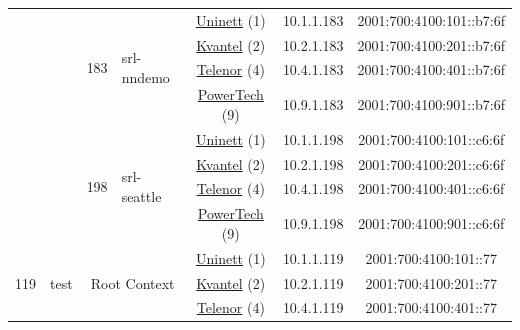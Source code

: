 \begin{small}
\begin{center}
\begin{longtable}{|c|c|c|c|c|c|c|c|}
  &  & \multirow{4}{*}{\tiny{183}} & \multicolumn{1}{|l|}{\multirow{4}{*}{\tiny{srl-nndemo}}} & \multicolumn{2}{|c|}{\tiny{\href{https://www.uninett.no}{Uninett} (1)}} & \tiny{10.1.1.183} & \tiny{2001:700:4100:101::b7:6f} \\* \cline{5-5}\cline{6-6}\cline{7-7}\cline{8-8}
  &  &  &  & \multicolumn{2}{|c|}{\tiny{\href{http://kvantel.no}{Kvantel} (2)}} & \tiny{10.2.1.183} & \tiny{2001:700:4100:201::b7:6f} \\* \cline{5-5}\cline{6-6}\cline{7-7}\cline{8-8}
  &  &  &  & \multicolumn{2}{|c|}{\tiny{\href{https://www.telenor.no}{Telenor} (4)}} & \tiny{10.4.1.183} & \tiny{2001:700:4100:401::b7:6f} \\* \cline{5-5}\cline{6-6}\cline{7-7}\cline{8-8}
  &  &  &  & \multicolumn{2}{|c|}{\tiny{\href{http://www.powertech.no}{PowerTech} (9)}} & \tiny{10.9.1.183} & \tiny{2001:700:4100:901::b7:6f} \\* \cline{3-3}\cline{4-4}\cline{5-5}\cline{6-6}\cline{7-7}\cline{8-8}
  &  & \multirow{4}{*}{\tiny{198}} & \multicolumn{1}{|l|}{\multirow{4}{*}{\tiny{srl-seattle}}} & \multicolumn{2}{|c|}{\tiny{\href{https://www.uninett.no}{Uninett} (1)}} & \tiny{10.1.1.198} & \tiny{2001:700:4100:101::c6:6f} \\* \cline{5-5}\cline{6-6}\cline{7-7}\cline{8-8}
  &  &  &  & \multicolumn{2}{|c|}{\tiny{\href{http://kvantel.no}{Kvantel} (2)}} & \tiny{10.2.1.198} & \tiny{2001:700:4100:201::c6:6f} \\* \cline{5-5}\cline{6-6}\cline{7-7}\cline{8-8}
  &  &  &  & \multicolumn{2}{|c|}{\tiny{\href{https://www.telenor.no}{Telenor} (4)}} & \tiny{10.4.1.198} & \tiny{2001:700:4100:401::c6:6f} \\* \cline{5-5}\cline{6-6}\cline{7-7}\cline{8-8}
  &  &  &  & \multicolumn{2}{|c|}{\tiny{\href{http://www.powertech.no}{PowerTech} (9)}} & \tiny{10.9.1.198} & \tiny{2001:700:4100:901::c6:6f} \\ \hline
 \multirow{20}{*}{\tiny{119}} & \multicolumn{1}{|l|}{\multirow{20}{*}{\tiny{test}}} & \multicolumn{2}{|c|}{\multirow{4}{*}{\tiny{Root Context}}} & \multicolumn{2}{|c|}{\tiny{\href{https://www.uninett.no}{Uninett} (1)}} & \tiny{10.1.1.119} & \tiny{2001:700:4100:101::77} \\* \cline{5-5}\cline{6-6}\cline{7-7}\cline{8-8}
  &  & \multicolumn{2}{|c|}{} & \multicolumn{2}{|c|}{\tiny{\href{http://kvantel.no}{Kvantel} (2)}} & \tiny{10.2.1.119} & \tiny{2001:700:4100:201::77} \\* \cline{5-5}\cline{6-6}\cline{7-7}\cline{8-8}
  &  & \multicolumn{2}{|c|}{} & \multicolumn{2}{|c|}{\tiny{\href{https://www.telenor.no}{Telenor} (4)}} & \tiny{10.4.1.119} & \tiny{2001:700:4100:401::77} \\* \cline{5-5}\cline{6-6}\cline{7-7}\cline{8-8}

\end{longtable}
\end{center}
\end{small}
